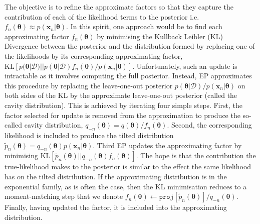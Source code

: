 The objective is to refine the approximate factors so that they capture the contribution of each of the likelihood terms to the posterior i.e.~$f_n(\bm{\theta}) \approx p(\bm{x}_n | \bm{\theta})$. In this spirit, one approach would be to find each approximating factor $f_n(\bm{\theta})$ by minimising the Kullback Leibler (KL) Divergence between the posterior and the distribution formed by replacing one of the likelihoods by its corresponding approximating factor,  $\mathrm{KL}[p(\bm{\theta}|\mathcal{D}) || p(\bm{\theta}|\mathcal{D}) f_n(\bm{\theta})/ p(\bm{x}_n | \bm{\theta})]$. Unfortunately, such an update is intractable as it involves computing the full posterior. Instead, EP approximates this procedure by replacing the leave-one-out posterior $p(\bm{\theta}|\mathcal{D}) / p(\bm{x}_n | \bm{\theta})$ on both sides of the KL by the approximate leave-one-out posterior (called the cavity distribution). This is achieved by iterating four simple steps. First, the factor selected for update is removed from the approximation to produce the so-called cavity distribution, $q_{-n}(\bm{\theta}) =q(\bm{\theta})/f_n(\bm{\theta})$. Second, the corresponding likelihood is included to produce the tilted distribution $\tilde{p}_n(\bm{\theta}) = q_{-n}(\bm{\theta}) p(\bm{x}_n | \bm{\theta})$. Third EP updates the approximating factor by minimising $\mathrm{KL}[\tilde{p}_n(\bm{\theta}) || q_{-n}(\bm{\theta})  f_n(\bm{\theta})]$. The hope is that the contribution the true-likelihood makes to the posterior is similar to the effect the same likelihood has on the tilted distribution. If the approximating distribution is in the exponential family, as is often the case, then the KL minimisation reduces to a moment-matching step \cite{amari:ig} that we denote $f_n(\bm{\theta}) \leftarrow \mathtt{proj}[\tilde{p}_n(\bm{\theta})] / q_{-n}(\bm{\theta}) $. Finally, having updated the factor, it is included into the approximating distribution.
%
%
%
%
%

